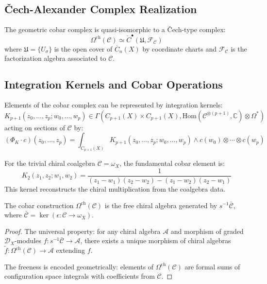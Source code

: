 \subsection{Čech-Alexander Complex Realization}

\begin{theorem}\label{thm:cobar-cech}
The geometric cobar complex is quasi-isomorphic to a Čech-type complex:
\[
\Omega^{\text{ch}}(\mathcal{C}) \simeq \check{C}^{\bullet}(\mathfrak{U}, \mathcal{F}_{\mathcal{C}})
\]
where $\mathfrak{U} = \{U_{\sigma}\}$ is the open cover of $\overline{C}_n(X)$ by coordinate charts and $\mathcal{F}_{\mathcal{C}}$ is the factorization algebra associated to $\mathcal{C}$.
\end{theorem}

\subsection{Integration Kernels and Cobar Operations}

\begin{definition}\label{def:cobar-kernel}
Elements of the cobar complex can be represented by integration kernels:
\[
K_{p+1}(z_0, \ldots, z_p; w_0, \ldots, w_p) \in \Gamma\left(C_{p+1}(X) \times C_{p+1}(X), \text{Hom}(\mathcal{C}^{\otimes(p+1)}, \mathbb{C}) \otimes \Omega^*\right)
\]
acting on sections of $\mathcal{C}$ by:
\[
(\Phi_K \cdot c)(z_0, \ldots, z_p) = \int_{C_{p+1}(X)} K_{p+1}(z_0, \ldots, z_p; w_0, \ldots, w_p) \wedge c(w_0) \otimes \cdots \otimes c(w_p)
\]
\end{definition}

\begin{example}\label{ex:fundamental-cobar}
For the trivial chiral coalgebra $\mathcal{C} = \omega_X$, the fundamental cobar element is:
\[
K_2(z_1, z_2; w_1, w_2) = \frac{1}{(z_1 - w_1)(z_2 - w_2) - (z_1 - w_2)(z_2 - w_1)}
\]
This kernel reconstructs the chiral multiplication from the coalgebra data.
\end{example}

\begin{theorem}\label{thm:cobar-free}
The cobar construction $\Omega^{\text{ch}}(\mathcal{C})$ is the free chiral algebra generated by $s^{-1}\bar{\mathcal{C}}$, where $\bar{\mathcal{C}} = \ker(\epsilon: \mathcal{C} \to \omega_X)$.
\end{theorem}

\begin{proof}
The universal property: for any chiral algebra $\mathcal{A}$ and morphism of graded $\mathcal{D}_X$-modules $f: s^{-1}\bar{\mathcal{C}} \to \mathcal{A}$, there exists a unique morphism of chiral algebras $\tilde{f}: \Omega^{\text{ch}}(\mathcal{C}) \to \mathcal{A}$ extending $f$.

The freeness is encoded geometrically: elements of $\Omega^{\text{ch}}(\mathcal{C})$ are formal sums of configuration space integrals with coefficients from $\mathcal{C}$.
\end{proof}

